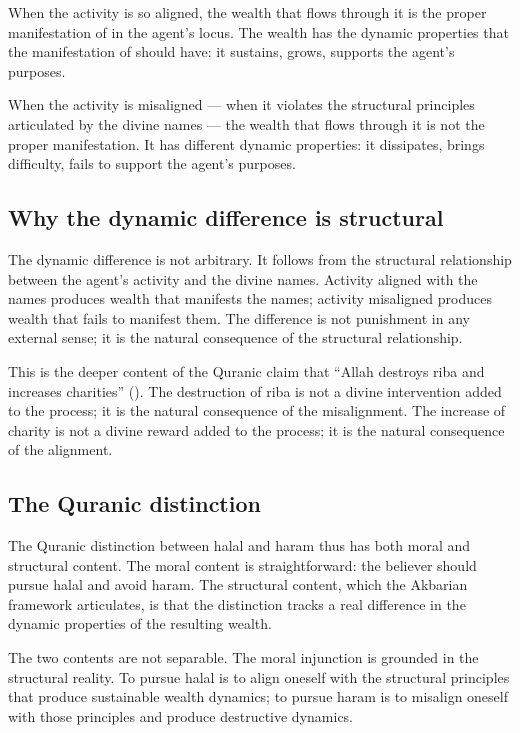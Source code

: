 When the activity is so aligned, the wealth that flows through it
is the proper manifestation of  in the agent's locus.
The wealth has the dynamic properties that the manifestation of
 should have: it sustains, grows, supports the
agent's purposes.

When the activity is misaligned --- when it violates the structural
principles articulated by the divine names --- the wealth that
flows through it is not the proper manifestation. It has different
dynamic properties: it dissipates, brings difficulty, fails to
support the agent's purposes.

\subsection{Why the dynamic difference is structural}

The dynamic difference is not arbitrary. It follows from the
structural relationship between the agent's activity and the divine
names. Activity aligned with the names produces wealth that
manifests the names; activity misaligned produces wealth that
fails to manifest them. The difference is not punishment in any
external sense; it is the natural consequence of the structural
relationship.

This is the deeper content of the Quranic claim that ``Allah
destroys riba and increases charities'' (). The
destruction of riba is not a divine intervention added to the
process; it is the natural consequence of the misalignment. The
increase of charity is not a divine reward added to the process; it
is the natural consequence of the alignment.

\subsection{The Quranic distinction}

The Quranic distinction between halal and haram thus has both moral
and structural content. The moral content is straightforward: the
believer should pursue halal and avoid haram. The structural
content, which the Akbarian framework articulates, is that the
distinction tracks a real difference in the dynamic properties of
the resulting wealth.

The two contents are not separable. The moral injunction is
grounded in the structural reality. To pursue halal is to align
oneself with the structural principles that produce sustainable
wealth dynamics; to pursue haram is to misalign oneself with those
principles and produce destructive dynamics.

